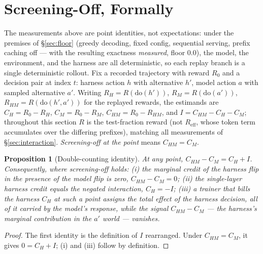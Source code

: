 \documentclass{article}
\newtheorem{proposition}{Proposition}
\theoremstyle{remark}
\begin{document}
\section{Screening-Off, Formally}
\label{app:formal}
\label{sec:formal}
The measurements above are point identities, not expectations: under the
premises of \S\ref{sec:floor} (greedy decoding, fixed config, sequential
serving, prefix caching off --- with the resulting exactness \emph{measured},
floor $0.0$), the model, the environment, and the harness are all
deterministic, so each replay branch is a single deterministic rollout. Fix
a recorded trajectory with reward $R_0$ and a decision pair at index $t$:
harness action $h$ with alternative $h'$, model action $a$ with sampled
alternative $a'$. Writing $R_H = R(\mathrm{do}(h'))$,
$R_M = R(\mathrm{do}(a'))$, $R_{HM} = R(\mathrm{do}(h', a'))$ for the
replayed rewards, the estimands are $C_H = R_0 - R_H$, $C_M = R_0 - R_M$,
$C_{HM} = R_0 - R_{HM}$, and $I = C_{HM} - C_H - C_M$; throughout this
section $R$ is the test-fraction reward (not $R_{\mathrm{eff}}$, whose token
term accumulates over the differing prefixes), matching all measurements of
\S\ref{sec:interaction}. \emph{Screening-off
at the point} means $C_{HM} = C_M$.

\begin{proposition}[Double-counting identity]
\label{prop:dc}
At any point, $C_{HM} - C_M = C_H + I$. Consequently, where screening-off
holds: (i) the marginal credit of the harness flip in the presence of the
model flip is zero, $C_{HM} - C_M = 0$; (ii) the single-layer harness credit
equals the negated interaction, $C_H = -I$; (iii) a trainer that bills the
harness $C_H$ at such a point assigns the \emph{total} effect of the
harness decision, all of it carried by the model's response, while the
signal $C_{HM} - C_M$ --- the harness's marginal contribution in the
$a'$ world --- vanishes.
\end{proposition}
\begin{proof}
The first identity is the definition of $I$ rearranged. Under
$C_{HM} = C_M$, it gives $0 = C_H + I$; (i) and (iii) follow by definition.
\end{proof}
\end{document}
